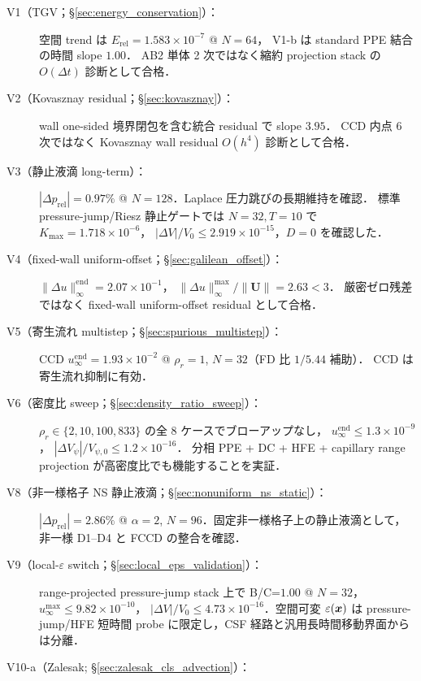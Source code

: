 \begin{description}
  \item[V1（TGV；§\ref{sec:energy_conservation}）：]
        空間 trend は $E_{\mathrm{rel}}=1.583\times10^{-7}$ @ $N=64$，
        V1-b は standard PPE 結合の時間 slope $1.00$．
        AB2 単体 2 次ではなく縮約 projection stack の $O(\Delta t)$ 診断として合格．
  \item[V2（Kovasznay residual；§\ref{sec:kovasznay}）：]
        wall one-sided 境界閉包を含む統合 residual で slope $3.95$．
        CCD 内点 6 次ではなく Kovasznay wall residual $O(h^4)$ 診断として合格．
  \item[V3（静止液滴 long-term）：]
        $|\Delta p_\mathrm{rel}| = 0.97\%$ @ $N=128$．Laplace 圧力跳びの長期維持を確認．
        標準 pressure-jump/Riesz 静止ゲートでは
        $N=32,T=10$ で $K_{\max}=1.718\times10^{-6}$，
        $|\Delta V|/V_0\le2.919\times10^{-15}$，$D=0$ を確認した．
  \item[V4（fixed-wall uniform-offset；§\ref{sec:galilean_offset}）：]
        $\|\Delta u\|_\infty^{\mathrm{end}}=2.07\times10^{-1}$，
        $\|\Delta u\|_\infty^{\max}/\|\bm U\|=2.63<3$．
        厳密ゼロ残差ではなく fixed-wall uniform-offset residual として合格．
  \item[V5（寄生流れ multistep；§\ref{sec:spurious_multistep}）：]
        CCD $u_\infty^{\mathrm{end}}=1.93\!\times\!10^{-2}$ @ $\rho_r=1$, $N=32$（FD 比 $1/5.44$ 補助）．
        CCD は寄生流れ抑制に有効．
  \item[V6（密度比 sweep；§\ref{sec:density_ratio_sweep}）：]
        $\rho_r\in\{2,10,100,833\}$ の全 8 ケースでブローアップなし，
        $u_\infty^{\mathrm{end}}\le1.3\times10^{-9}$，
        $|\Delta V_\psi|/V_{\psi,0}\le1.2\times10^{-16}$．
        分相 PPE + DC + HFE + capillary range projection が高密度比でも機能することを実証．
  \item[V8（非一様格子 NS 静止液滴；§\ref{sec:nonuniform_ns_static}）：]
        $|\Delta p_\mathrm{rel}| = 2.86\%$ @ $\alpha=2$, $N=96$．固定非一様格子上の静止液滴として，
        非一様 D1--D4 と FCCD の整合を確認．
  \item[V9（local-$\varepsilon$ switch；§\ref{sec:local_eps_validation}）：]
        range-projected pressure-jump stack 上で B/C=$1.00$ @ $N=32$，
        $u_\infty^{\max}\le9.82\times10^{-10}$，
        $|\Delta V|/V_0\le4.73\times10^{-16}$．空間可変 $\varepsilon(\bm{x})$ は
        pressure-jump/HFE 短時間 probe に限定し，CSF 経路と汎用長時間移動界面からは分離．
  \item[V10-a（Zalesak; §\ref{sec:zalesak_cls_advection}）：]

\end{description}
